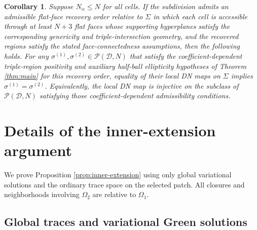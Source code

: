 \documentclass[11pt,oneside]{article}
\newtheorem{corollary}[theorem]{Corollary}
\begin{document}
\begin{corollary}
\label{cor:uniform-degree}
Suppose \(N_\alpha\le N\) for all cells.  If the subdivision admits an
admissible flat-face recovery order relative to \(\Sigma\) in which each cell is
accessible through at least \(N+3\) flat faces whose supporting hyperplanes
satisfy the corresponding genericity and triple-intersection geometry, and the
recovered regions satisfy the stated face-connectedness assumptions, then the
following holds.  For any
\(\sigma^{(1)},\sigma^{(2)}\in\mathcal P(\mathcal D,N)\) that satisfy the
coefficient-dependent triple-region positivity and auxiliary half-ball
ellipticity hypotheses of Theorem \ref{thm:main} for this recovery order,
equality of their local DN maps on \(\Sigma\) implies
\(\sigma^{(1)}=\sigma^{(2)}\).  Equivalently, the local DN map is injective on
the subclass of \(\mathcal P(\mathcal D,N)\) satisfying those
coefficient-dependent admissibility conditions.
\end{corollary}


\appendix

\section{Details of the inner-extension argument}
\label{app:inner-extension-proof}

We prove Proposition \ref{prop:inner-extension} using only global variational
solutions and the ordinary trace space on the selected patch.  All closures and
neighborhoods involving \(\Omega_2\) are relative to \(\Omega_1\).

\subsection{Global traces and variational Green solutions}
\end{document}
